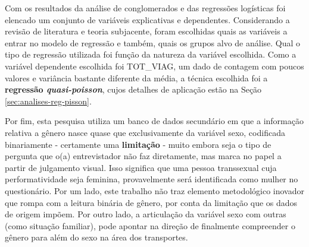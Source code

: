 Com os resultados da análise de conglomerados e das regressões logísticas foi elencado um conjunto de variáveis explicativas e dependentes.
Considerando a revisão de literatura e teoria subjacente, foram escolhidas quais as variáveis a entrar no modelo de regressão e também, quais os grupos alvo de análise.
Qual o tipo de regressão utilizada foi função da natureza da variável escolhida.
Como a variável dependente escolhida foi TOT_VIAG, um dado de contagem com poucos valores e variância bastante diferente da média, a técnica escolhida foi a \textbf{regressão \textit{quasi-poisson}}, cujos detalhes de aplicação estão na Seção \ref{sec:analises-reg-pisson}.

Por fim, esta pesquisa utiliza um banco de dados secundário em que a informação relativa a gênero nasce quase que exclusivamente da variável sexo, codificada binariamente - certamente uma \textbf{limitação} - muito embora seja o tipo de pergunta que o(a) entrevistador não faz diretamente, mas marca no papel a partir de julgamento visual. 
Isso significa que uma pessoa transsexual cuja performatividade seja feminina, provavelmente será identificada como mulher no questionário. 
Por um lado, este trabalho não traz elemento metodológico inovador que rompa com a leitura binária de gênero, por conta da limitação que os dados de origem impõem. 
Por outro lado, a articulação da variável sexo com outras (como situação familiar), pode apontar na direção de finalmente compreender o gênero para além do sexo na área dos transportes.
